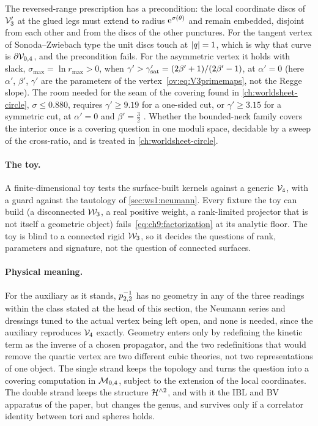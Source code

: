 The reversed-range prescription has a precondition: the local coordinate discs of ${\mathcal{V}}_3'$ at the glued legs must extend to radius $\mathrm{e}^{\sigma(\theta)}$ and remain embedded, disjoint from each other and from the discs of the other punctures.
For the tangent vertex of Sonoda--Zwiebach type the unit discs touch at ${|q|} = 1$, which is why that curve is $\partial {\mathcal{V}}_{0, 4}$, and the precondition fails.
For the asymmetric vertex it holds with slack, $\sigma_{\max} = \ln r_{\max} > 0$, when $\gamma' > \gamma'_{\rm sat} = (2 \beta' + 1) / (2 \beta' - 1)$, at $\alpha' = 0$ (here $\alpha'$, $\beta'$, $\gamma'$ are the parameters of the vertex~\eqref{ov:eq:V3primemaps}, not the Regge slope).
The room needed for the seam of the covering found in \cref{ch:worldsheet-circle}, $\sigma \le 0.880$, requires $\gamma' \ge 9.19$ for a one-sided cut, or $\gamma' \ge 3.15$ for a symmetric cut, at $\alpha' = 0$ and $\beta' = \tfrac32$ .
Whether the bounded-neck family covers the interior once is a covering question in one moduli space, decidable by a sweep of the cross-ratio, and is treated in \cref{ch:worldsheet-circle}.

\paragraph{The toy.}
A finite-dimensional toy tests the surface-built kernels against a generic $\mathcal{V}_{4}$, with a guard against the tautology of \cref{sec:ws1:neumann}.
Every fixture the toy can build (a disconnected ${\mathcal{W}}_3$, a real positive weight, a rank-limited projector that is not itself a geometric object) fails~\eqref{eq:ch9:factorization} at its analytic floor.
The toy is blind to a connected rigid ${\mathcal{W}}_3$, so it decides the questions of rank, parameters and signature, not the question of connected surfaces.

\paragraph{Physical meaning.}
For the auxiliary as it stands, $p_{2,2}^{-1}$ has no geometry in any of the three readings within the class stated at the head of this section, the Neumann series and dressings tuned to the actual vertex being left open, and none is needed, since the auxiliary reproduces $\mathcal{V}_{4}$ exactly.
Geometry enters only by redefining the kinetic term as the inverse of a chosen propagator, and the two redefinitions that would remove the quartic vertex are two different cubic theories, not two representations of one object.
The single strand keeps the topology and turns the question into a covering computation in ${\mathcal{M}}_{0, 4}$, subject to the extension of the local coordinates.
The double strand keeps the structure $\mathcal{H}^{\wedge 2}$, and with it the IBL and BV apparatus of the paper, but changes the genus, and survives only if a correlator identity between tori and spheres holds.


